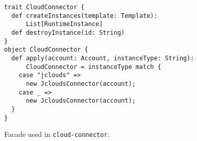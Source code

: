 \begin{figure}[tb]
  \begin{center}
    \begin{verbatim}
trait CloudConnector {
  def createInstances(template: Template): 
      List[RuntimeInstance]
  def destroyInstance(id: String)
}
object CloudConnector {
  def apply(account: Account, instanceType: String): 
      CloudConnector = instanceType match {
    case "jclouds" =>
      new JcloudsConnector(account);
    case _ =>
      new JcloudsConnector(account);
  }
}
    \end{verbatim}
  \end{center}
  \caption{Facade used in \texttt{cloud-connector}.}
  \label{list:connector-facade}
\end{figure}

